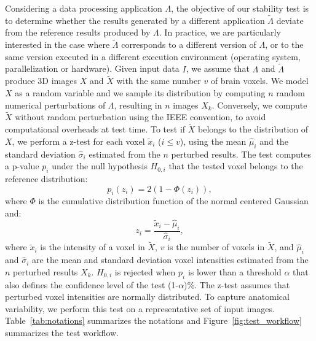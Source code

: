 \documentclass[lettersize,journal]{IEEEtran}
\begin{document}
Considering a data processing application $\Lambda$, the objective of our stability test is to determine whether the results generated by a different application $\tilde \Lambda$ deviate from the reference results produced by $\Lambda$. In practice, we are particularly interested in the case where $\tilde \Lambda$ corresponds to a different version of $\Lambda$, or to the same version executed in a different execution environment (operating system, parallelization or hardware). Given input data $I$, we assume that $\Lambda$ and $\tilde \Lambda$ produce 3D images $X$ and $\tilde X$ with the same number $v$ of brain voxels. We model $X$ as a random variable and we sample its distribution by computing $n$ random numerical perturbations of $\Lambda$, resulting in $n$ images $X_k$. Conversely, we compute $\tilde X$ without random perturbation using the IEEE convention, to avoid computational overheads at test time. To test if $\tilde X$ belongs to the distribution of $X$, we perform a z-test for each voxel $\tilde x_i$ ($i\leq v$), using the mean $\hat \mu_i$ and the standard deviation $\hat \sigma_i$ estimated from the $n$ perturbed results. The test computes a p-value $p_i$ under the null hypothesis $H_{0,i}$ that the tested voxel belongs to the reference distribution:
\begin{equation} \label{eq:pval}
    p_i(z_i) = 2 \left(1-\Phi(z_i)\right),
\end{equation}
where $\Phi$ is the cumulative distribution function of the normal centered
Gaussian and:
\begin{equation*}
    z_i = \frac{\tilde x_i-\hat \mu_i}{\hat \sigma_i},
\end{equation*}
where $\tilde x_i$ is the intensity of a voxel in $\tilde X$, $v$ is the number of voxels in $\tilde X$, and $\hat \mu_i$ and $\hat \sigma_i$ are the mean and standard deviation voxel intensities estimated from the $n$ perturbed results $X_k$. $H_{0,i}$ is rejected when $p_i$ is lower than a threshold $\alpha$ that also defines the confidence level of the test (1-$\alpha$)\%. The z-test assumes that perturbed voxel intensities are normally distributed. To capture anatomical variability, we perform this test on a representative set of input images. Table~\ref{tab:notations} summarizes the notations and Figure~\ref{fig:test_workflow} summarizes the test workflow.
\end{document}
